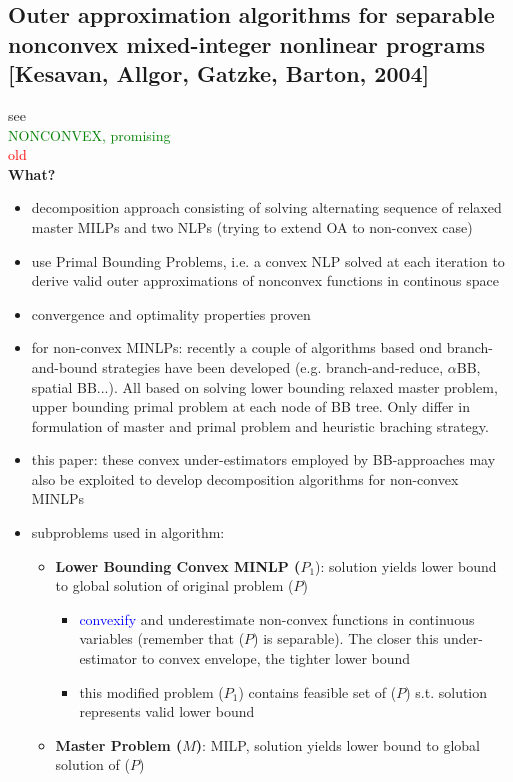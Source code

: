 \documentclass{article}
\begin{document}
\subsection{Outer approximation algorithms for separable nonconvex mixed-integer nonlinear programs [Kesavan, Allgor, Gatzke, Barton, 2004]}
\label{sec:OA_nonconvex}
see \cite{kesavan2004outer}\\
\textcolor{green}{NONCONVEX, promising}\\
\textcolor{red}{old}\\
\textbf{What?} 
\begin{itemize}
\item  decomposition approach consisting of solving alternating sequence of relaxed master MILPs and two NLPs (trying to extend OA to non-convex case)
\item use Primal Bounding Problems, i.e. a convex NLP solved at each iteration to derive valid outer approximations of nonconvex functions in continous space
\item convergence and optimality properties proven
\item for non-convex MINLPs: recently a couple of algorithms based ond branch-and-bound strategies have been developed (e.g. branch-and-reduce, $\alpha$BB, spatial BB...). All based on solving lower bounding relaxed master problem, upper bounding primal problem at each node of BB tree. Only differ in formulation of master and primal problem and heuristic braching strategy.
\item this paper: these convex under-estimators employed by BB-approaches may also be exploited to develop decomposition algorithms for non-convex MINLPs
\item subproblems used in algorithm:	
	\begin{itemize}
	\item \textbf{Lower Bounding Convex MINLP ($P_1$}): solution yields lower bound to global solution of original problem ($P$)
		\begin{itemize}
		\item \textcolor{blue}{convexify} and underestimate non-convex functions in continuous variables (remember that ($P$) is separable). The closer this under-estimator to convex envelope, the tighter lower bound
		\item this modified problem ($P_1$) contains feasible set of ($P$) s.t. solution represents valid lower bound
		\end{itemize}
	\item \textbf{Master Problem ($M$)}: MILP, solution yields lower bound to global solution of ($P$)

\end{itemize}
\end{itemize}
\end{document}
